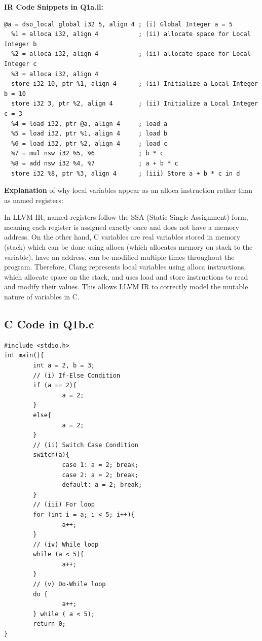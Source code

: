 \medskip\noindent\textbf{IR Code Snippets in Q1a.ll:}\par

\begin{lstlisting}
@a = dso_local global i32 5, align 4 ; (i) Global Integer a = 5
  %1 = alloca i32, align 4           ; (ii) allocate space for Local Integer b
  %2 = alloca i32, align 4           ; (ii) allocate space for Local Integer c
  %3 = alloca i32, align 4
  store i32 10, ptr %1, align 4      ; (ii) Initialize a Local Integer b = 10
  store i32 3, ptr %2, align 4       ; (ii) Initialize a Local Integer c = 3
  %4 = load i32, ptr @a, align 4     ; load a
  %5 = load i32, ptr %1, align 4     ; load b
  %6 = load i32, ptr %2, align 4     ; load c
  %7 = mul nsw i32 %5, %6            ; b * c
  %8 = add nsw i32 %4, %7            ; a + b * c
  store i32 %8, ptr %3, align 4      ; (iii) Store a + b * c in d
\end{lstlisting}

\textbf{Explanation} of why local variables appear as an alloca instruction rather than as named registers:


In LLVM IR, named registers follow the SSA (Static Single Assignment) form, meaning each register is assigned exactly once and does not have a memory address. On the other hand, C variables are real variables stored in memory (stack) which can be done using alloca (which allocates memory on stack to the variable), have an address, can be modified multiple times throughout the program. Therefore, Clang represents local variables using alloca instructions, which allocate space on the stack, and uses load and store instructions to read and modify their values. This allows LLVM IR to correctly model the mutable nature of variables in C. 


\subsection{C Code in Q1b.c}

\begin{lstlisting}
#include <stdio.h>
int main(){
        int a = 2, b = 3;
        // (i) If-Else Condition
        if (a == 2){
                a = 2;
        }
        else{
                a = 2;
        }
        // (ii) Switch Case Condition
        switch(a){
                case 1: a = 2; break;
                case 2: a = 2; break;
                default: a = 2; break;
        }
        // (iii) For loop
        for (int i = a; i < 5; i++){
                a++;
        }
        // (iv) While loop
        while (a < 5){
                a++;
        }
        // (v) Do-While loop
        do {
                a++;
        } while ( a < 5);
        return 0;
}
\end{lstlisting}

